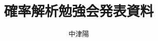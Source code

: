 \documentclass{ltjsarticle}
\theoremstyle{definition}
\begin{document}
\title{確率解析勉強会発表資料}
\author{中津陽}
\maketitle







\end{document}
